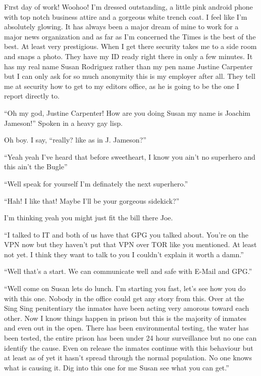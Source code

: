 \lettrine[lines=2,lraise=0]{F}{i}rst day of work! Woohoo! I'm dressed outstanding, a little pink android phone with top notch business attire and a gorgeous white trench coat. I feel like I'm absolutely glowing. It has always been a major dream of mine to work for a major news organization and as far as I'm concerned the Times is the best of the best. At least very prestigious. When I get there security takes me to a side room and snaps a photo. They have my ID ready right there in only a few minutes. It has my real name Susan Rodriguez rather than my pen name Justine Carpenter but I can only ask for so much anonymity this is my employer after all. They tell me at security how to get to my editors office, as he is going to be the one I report directly to.

``Oh my god, Justine Carpenter! How are you doing Susan my name is Joachim Jameson!'' Spoken in a heavy gay lisp. 

Oh boy. I say, ``really? like as in J. Jameson?''

``Yeah yeah I've heard that before sweetheart, I know you ain't no superhero and this ain't the Bugle''

``Well speak for yourself I'm definately the next superhero.''

``Hah! I like that! Maybe I'll be your gorgeous sidekick?''

I'm thinking yeah you might just fit the bill there Joe.

``I talked to IT and both of us have that GPG you talked about. You're on the VPN now but they haven't put that VPN over TOR like you mentioned. At least not yet. I think they want to talk to you I couldn't explain it worth a damn.''

``Well that's a start. We can communicate well and safe with E-Mail and GPG.''

``Well come on Susan lets do lunch. I'm starting you fast, let's see how you do with this one. Nobody in the office could get any story from this. Over at the Sing Sing penitentiary the inmates have been acting very amorous toward each other. Now I know things happen in prison but this is the majority of inmates and even out in the open. There has been environmental testing, the water has been tested, the entire prison has been under 24 hour surveillance but no one can identify the cause. Even on release the inmates continue with this behaviour but at least as of yet it hasn't spread through the normal population. No one knows what is causing it. Dig into this one for me Susan see what you can get.''

